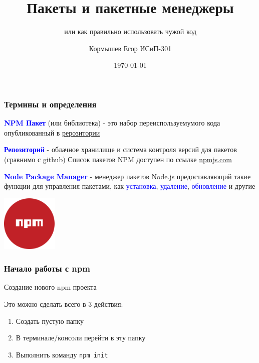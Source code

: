 \documentclass[aspectratio=169]{beamer}
\title{Пакеты и пакетные менеджеры}
\subtitle{или как правильно использовать чужой код}
\author{Кормышев Егор ИСиП-301}
\date{\today}
\begin{document}
\frame{\titlepage}


\begin{frame}
\frametitle{Термины и определения}


\textcolor{blue}{\textbf{NPM Пакет}} (или библиотека) -  это набор переиспользуемумого кода опубликованный в \underline{рерозитории}

\bigskip


\textcolor{blue}{\textbf{Репозиторий}} - облачное хранилище и система контроля версий для пакетов (сравнимо с github) 
Список пакетов NPM доступен по ссылке \underline{\href{https://www.npmjs.com/}{npmjs.com}}

\bigskip


\textcolor{blue}{\textbf{Node Package Manager}} - менеджер пакетов Node.js предоставляющий такие функции для управления пакетами, как \textcolor{blue}{установка}, \textcolor{blue}{удаление}, \textcolor{blue}{обновление} и другие

\bigskip
\begin{center}
\includegraphics[width=0.2\textwidth]{assets/npmicon.png}
\end{center}

\end{frame}


\begin{frame}
  \frametitle{Начало работы с npm}
  \begin{center}
    \large Создание нового npm проекта
  \end{center}
  
  \bigskip
  
  Это можно сделать всего в 3 действия:
  \begin{enumerate}
  \item Создать пустую папку
  \item В терминале/консоли перейти в эту папку
  \item Выполнить команду \texttt{npm init}
  \end{enumerate}
\end{frame}
\end{document}
